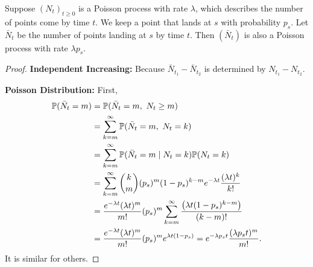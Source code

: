 \begin{thm}
    Suppose $(N_t)_{t \geq 0}$ is a Poisson process with rate $\lambda$, which describes the number of points come by time $t$. We keep a point that lands at $s$ with probability $p_s$. Let $\bar{N}_t$ be the number of points landing at $s$ by time $t$. Then $(\bar{N}_t)$ is also a Poisson process with rate $\lambda p_s$.
\end{thm}
\begin{proof}
    \noindent \textbf{Independent Increasing:} Because $\bar{N}_{t_1} - \bar{N}_{t_2}$ is determined by $N_{t_1} - N_{t_2}$.

    \noindent \textbf{Poisson Distribution:} First,
    \begin{equation*}
        \begin{aligned}
            \mathbb{P}(\bar{N}_t = m) &= \mathbb{P}(\bar{N}_t = m,~N_t \geq m) \\
            &= \sum_{k=m}^\infty \mathbb{P}(\bar{N}_t = m,~N_t = k) \\
            &= \sum_{k=m}^\infty \mathbb{P}(\bar{N}_t = m\mid N_t = k)\mathbb{P}(N_t = k) \\
            &= \sum_{k=m}^\infty \binom{k}{m}(p_s)^m(1-p_s)^{k-m} e^{-\lambda t}\frac{(\lambda t)^k}{k!} \\
            &= \frac{e^{-\lambda t}(\lambda t)^{m}}{m!}(p_s)^m \sum_{k=m}^\infty  \frac{\left(\lambda t(1 - p_s)^{k-m}\right)}{(k-m)!}\\
            &= \frac{e^{-\lambda t}(\lambda t)^{m}}{m!}(p_s)^m e^{\lambda t (1 - p_s)} = e^{- \lambda p_s t} \frac{(\lambda p_s t)^{m}}{m!}.
        \end{aligned}
    \end{equation*}
    It is similar for others.
\end{proof}

